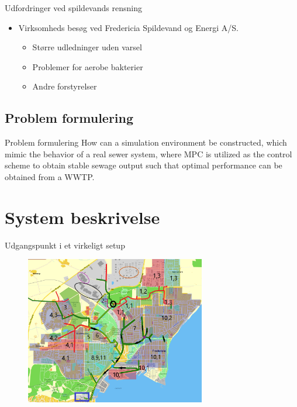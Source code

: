 \begin{frame}{Udfordringer ved spildevands rensning}{}
\vfill\vfill\centering
\begin{itemize}
	\item Virksomheds besøg ved Fredericia Spildevand og Energi A/S.
	
	\begin{itemize}
		\item<1-> Større udledninger uden varsel
		\item<2-> Problemer for aerobe bakterier
		\item<3-> Andre forstyrelser
	\end{itemize}	

\end{itemize}
\vfill\vfill
\end{frame}

\subsection{Problem formulering}

\begin{frame}{Problem formulering}{}
\vfill\vfill\centering
How can a simulation environment be constructed, which mimic the behavior of a real
sewer system, where MPC is utilized as the control scheme to obtain stable sewage output
such that optimal performance can be obtained from a WWTP.
\vfill\vfill
\end{frame}

\section{System beskrivelse} %


\begin{frame}{Udgangspunkt i et virkeligt setup}{}
\begin{figure}[H]
\centering
\includegraphics[width=0.7\textwidth]{Sections/pictures/kloakgrid_simplified10.png}
\end{figure}
\end{frame}

